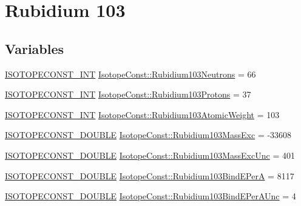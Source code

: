 \hypertarget{group___isotope_const-_rubidium-_rb103}{}\section{Rubidium 103}
\label{group___isotope_const-_rubidium-_rb103}
\subsection*{Variables}
\begin{DoxyCompactItemize}
\item 
\mbox{\hyperlink{group___isotope_const-_macros_ga5f18360b3e99483a35c32d789e62621c}{I\+S\+O\+T\+O\+P\+E\+C\+O\+N\+S\+T\+\_\+\+I\+NT}} \mbox{\hyperlink{group___isotope_const-_rubidium-_rb103_gab0c16abec84650fbaaaf82094af40074}{Isotope\+Const\+::\+Rubidium103\+Neutrons}} = 66
\item 
\mbox{\hyperlink{group___isotope_const-_macros_ga5f18360b3e99483a35c32d789e62621c}{I\+S\+O\+T\+O\+P\+E\+C\+O\+N\+S\+T\+\_\+\+I\+NT}} \mbox{\hyperlink{group___isotope_const-_rubidium-_rb103_ga613d6bec3f78291658de358c38bcf7df}{Isotope\+Const\+::\+Rubidium103\+Protons}} = 37
\item 
\mbox{\hyperlink{group___isotope_const-_macros_ga5f18360b3e99483a35c32d789e62621c}{I\+S\+O\+T\+O\+P\+E\+C\+O\+N\+S\+T\+\_\+\+I\+NT}} \mbox{\hyperlink{group___isotope_const-_rubidium-_rb103_ga675e2b14381f8e7da79d22f6431dfa25}{Isotope\+Const\+::\+Rubidium103\+Atomic\+Weight}} = 103
\item 
\mbox{\hyperlink{group___isotope_const-_macros_ga8f45a7272ce02c0b4c65c44636ed719a}{I\+S\+O\+T\+O\+P\+E\+C\+O\+N\+S\+T\+\_\+\+D\+O\+U\+B\+LE}} \mbox{\hyperlink{group___isotope_const-_rubidium-_rb103_gaa5196bccf261da1dc06e31c6e2509ecf}{Isotope\+Const\+::\+Rubidium103\+Mass\+Exc}} = -\/33608
\item 
\mbox{\hyperlink{group___isotope_const-_macros_ga8f45a7272ce02c0b4c65c44636ed719a}{I\+S\+O\+T\+O\+P\+E\+C\+O\+N\+S\+T\+\_\+\+D\+O\+U\+B\+LE}} \mbox{\hyperlink{group___isotope_const-_rubidium-_rb103_ga8f453dba4bca13e946efa05465d2d942}{Isotope\+Const\+::\+Rubidium103\+Mass\+Exc\+Unc}} = 401
\item 
\mbox{\hyperlink{group___isotope_const-_macros_ga8f45a7272ce02c0b4c65c44636ed719a}{I\+S\+O\+T\+O\+P\+E\+C\+O\+N\+S\+T\+\_\+\+D\+O\+U\+B\+LE}} \mbox{\hyperlink{group___isotope_const-_rubidium-_rb103_ga9eebf343247ae664f3013ea9709173ca}{Isotope\+Const\+::\+Rubidium103\+Bind\+E\+PerA}} = 8117
\item 
\mbox{\hyperlink{group___isotope_const-_macros_ga8f45a7272ce02c0b4c65c44636ed719a}{I\+S\+O\+T\+O\+P\+E\+C\+O\+N\+S\+T\+\_\+\+D\+O\+U\+B\+LE}} \mbox{\hyperlink{group___isotope_const-_rubidium-_rb103_ga44164f2094fa73f354d8d70772d3bba1}{Isotope\+Const\+::\+Rubidium103\+Bind\+E\+Per\+A\+Unc}} = 4

\end{DoxyCompactItemize}
